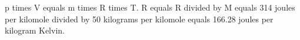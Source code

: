 p times V equals m times R times T.  
R equals R divided by M equals 314 joules per kilomole divided by 50 kilograms per kilomole equals 166.28 joules per kilogram Kelvin.